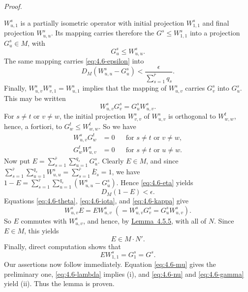 \documentclass[b5paper,twoside]{article}
\newcommand{\lemref}[2]{\hyperref[#1]{\mbox{Lemma~#2}}}
\theoremstyle{mvnplain}
\renewenvironment{proof}[1][Proof]{%
  \par\addvspace{0.35\baselineskip}%
  \noindent\textit{#1.}\ \normalfont\ignorespaces
}{%
  \par\addvspace{0.35\baselineskip}%
}
\newcommand{\M}{\mathbf M}
\newcommand{\N}{\mathbf N}
\def\M{M}%
\def\N{N}%
\begin{document}
\begin{proof}
\(W^s_{u,1}\) is a partially isometric operator with initial projection
\(W^s_{1,1}\) and final projection \(W^s_{u,u}\). Its mapping carries
therefore the \(G^s\leq W^s_{1,1}\) into a projection \(G^s_u\in\M\), with
\begin{equation}\tag{4.6.\(\zeta\)}\label{eq:4.6-zeta}
 G^s_u\leq W^s_{u,u}.
\end{equation}
The same mapping carries \eqref{eq:4.6-epsilon} into
\begin{equation}\tag{4.6.\(\eta\)}\label{eq:4.6-eta}
 D_{\M}(W^s_{u,u}-G^s_u)<\frac{\epsilon}{\sum_{s=1}^{\bar r}q_s}.
\end{equation}
Finally, \(W^s_{u,v}W^s_{v,1}=W^s_{u,1}\) implies that the mapping of
\(W^s_{u,v}\) carries \(G^s_v\) into \(G^s_u\). This may be written
\begin{equation}\tag{4.6.\(\theta\)}\label{eq:4.6-theta}
 W^s_{u,v}G^s_v=G^s_uW^s_{u,v}.
\end{equation}
For \(s\ne t\) or \(v\ne w\), the initial projection \(W^s_{v,v}\) of
\(W^s_{u,v}\) is orthogonal to \(W^t_{w,w}\), hence, a fortiori, to
\(G^t_w\leq W^t_{w,w}\). So we have
\begin{align}
 W^s_{u,v}G^t_w&=0 &&\text{for }s\ne t\text{ or }v\ne w,
   \tag{4.6.\(\iota\)}\label{eq:4.6-iota}\\
 G^t_wW^s_{u,v}&=0 &&\text{for }s\ne t\text{ or }u\ne w.
   \tag{4.6.\(\kappa\)}\label{eq:4.6-kappa}
\end{align}
Now put \(E=\sum_{s=1}^{\bar r}\sum_{u=1}^{q_s}G^s_u\). Clearly
\(E\in\M\), and since
\(\sum_{s=1}^{\bar r}\sum_{u=1}^{q_s}W^s_{u,u}=
\sum_{s=1}^{\bar r}\bar E_s=1\), we have
\(1-E=\sum_{s=1}^{\bar r}\sum_{u=1}^{q_s}(W^s_{u,u}-G^s_u)\). Hence
\eqref{eq:4.6-eta} yields
\begin{equation}\tag{4.6.\(\lambda\)}\label{eq:4.6-lambda}
 D_{\M}(1-E)<\epsilon.
\end{equation}
Equations \eqref{eq:4.6-theta}, \eqref{eq:4.6-iota}, and
\eqref{eq:4.6-kappa} give
\[
 W^s_{u,v}E=EW^s_{u,v}
  \;(=W^s_{u,v}G^s_v=G^s_uW^s_{u,v}).
\]
So \(E\) commutes with \(W^s_{u,v}\), and hence, by
\lemref{lem:4.5.5}{4.5.5}, with all of \(\N\). Since \(E\in\M\), this yields
\begin{equation}\tag{4.6.\(\mu\)}\label{eq:4.6-mu}
 E\in\M\mathbin{\cdot}\N'.
\end{equation}
Finally, direct computation shows that
\begin{equation}\tag{4.6.\(\nu\)}\label{eq:4.6-nu}
 EW^s_{1,1}=G^s_1=G^s.
\end{equation}
Our assertions now follow immediately. Equation \eqref{eq:4.6-mu} gives the
preliminary one, \eqref{eq:4.6-lambda} implies (i), and
\eqref{eq:4.6-nu} and \eqref{eq:4.6-gamma} yield (ii). Thus the lemma is
proven.
\end{proof}
\end{document}

